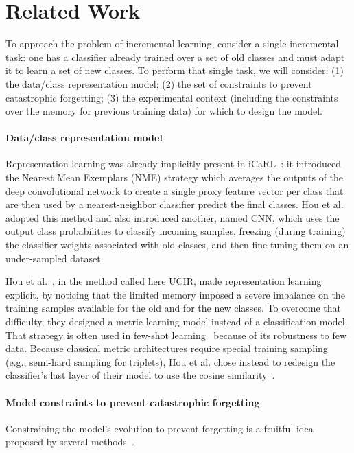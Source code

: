 \section{Related Work}
\label{sec:related_work}

To approach the problem of incremental learning, consider a single incremental task: one has a
classifier already trained over a set of old classes and must adapt it to learn a set of new
classes. To perform that single task, we will consider: (1) the data/class representation model; (2)
the set of constraints to prevent catastrophic forgetting; (3) the experimental context (including
the constraints over the memory for previous training data) for which to design the model.

\paragraph{Data/class representation model} Representation learning was already implicitly present
in iCaRL~\citep{rebuffi2017icarl}: it introduced the Nearest Mean Exemplars (NME) strategy which
averages the outputs of the deep convolutional network to create a single proxy feature vector per
class that are then used by a nearest-neighbor classifier predict the final classes. Hou et
al.~\citep{hou2019ucir} adopted this method and also introduced another, named CNN, which uses the
output class probabilities to classify incoming samples, freezing (during training) the classifier
weights associated with old classes, and then fine-tuning them on an under-sampled dataset.

Hou et al.~\citep{hou2019ucir}, in the method called here UCIR, made representation learning
explicit, by noticing that the limited memory imposed a severe imbalance on the training samples
available for the old and for the new classes. To overcome that difficulty, they designed a
metric-learning model instead of a classification model. That strategy is often used in few-shot
learning~\citep{gidaris2018fewshot_wo_forgetting} because of its robustness to few data. Because
classical metric architectures require special training sampling (e.g., semi-hard sampling for
triplets), Hou et al. chose instead to redesign the classifier's last layer of their model to use
the cosine similarity~\citep{luo2018cosine_classifier}.

\paragraph{Model constraints to prevent catastrophic forgetting} Constraining the model's evolution
to prevent forgetting is a fruitful idea proposed by several
methods~\citep{kirkpatrick2017ewc,lopezpaz2017gem,aljundi2018MemoryAwareSynapses,li2018lwf,rebuffi2017icarl,castro2018end_to_end_inc_learn}.

